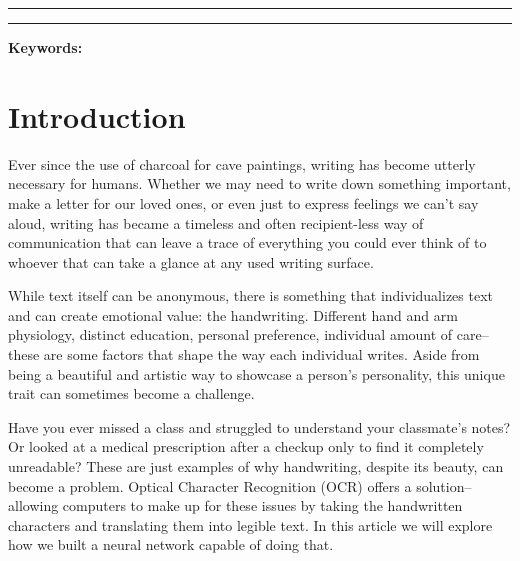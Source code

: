 \documentclass[11pt,letterpaper]{article}
\begin{document}
	
	\rule{17cm}{0.1mm}
	
	\authorrowtwo
	{}
	{}
	
	\authorrowtwo
	{}
	{}
	
	\rule{17cm}{0.1mm}
	
	\begin{abstract}
	\end{abstract}
	
	\smallskip
	\noindent\textbf{Keywords: } %
	
	\section{Introduction}
	Ever since the use of charcoal for cave paintings, writing has become utterly necessary for humans. Whether we may need to write down something important, make a letter for our loved ones, or even just to express feelings we can't say aloud, writing has became a timeless and often recipient-less way of communication that can leave a trace of everything you could ever think of to whoever that can take a glance at any used writing surface.
	
	While text itself can be anonymous, there is something that individualizes text and can create emotional value: the handwriting. Different hand and arm physiology, distinct education, personal preference, individual amount of care--these are some factors that shape the way each individual writes. Aside from being a beautiful and artistic way to showcase a person's personality, this unique trait can sometimes become a challenge.
	
	Have you ever missed a class and struggled to understand your classmate's notes? Or looked at a medical prescription after a checkup only to find it completely unreadable? These are just examples of why handwriting, despite its beauty, can become a problem. Optical Character Recognition (OCR) offers a solution--allowing computers to make up for these issues by taking the handwritten characters and translating them into legible text. In this article we will explore how we built a neural network capable of doing that.
	
\end{document}
